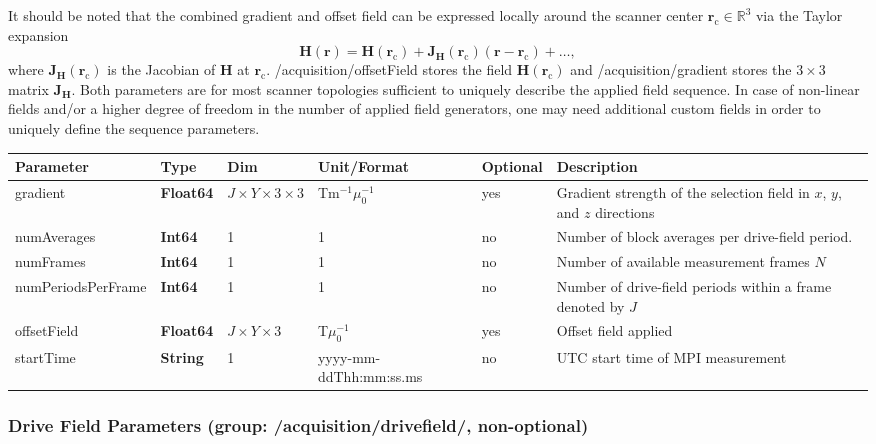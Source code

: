 \documentclass[landscape,a4paper]{article} %
\newcommand{\inltab}[1]{{\ttfamily\bfseries\color{blue}#1}}
\newcommand{\inlvar}[1]{{\ttfamily#1}}
\begin{document}
\begin{multicols}{2}
It should be noted that the combined gradient and offset field can be expressed locally around the scanner center $\mathbf r_\text{c}\in \mathbb R^3$ via the Taylor expansion
\begin{equation}
	\mathbf H(\mathbf r) = \mathbf H(\mathbf r_\text{c}) + \mathbf J_{\mathbf H}(\mathbf r_\text{c}) (\mathbf r - \mathbf r_\text{c}) + \dots,
\end{equation}
where $\mathbf J_{\mathbf H}(\mathbf r_\text{c})$ is the Jacobian of $\mathbf H$ at $\mathbf r_\text{c}$. \inlvar{/acquisition/offsetField} stores the field $\mathbf H(\mathbf r_\text{c})$ and \inlvar{/acquisition/gradient} stores the $3\times 3$ matrix $\mathbf J_{\mathbf H}$. Both parameters are for most scanner topologies sufficient to uniquely describe the applied field sequence. In case of non-linear fields and/or a higher degree of freedom in the number of applied field generators, one may need additional custom fields in order to uniquely define the sequence parameters.

\end{multicols}

\noindent \begin{tabularx}{\columnwidth}{lllllX}
\textbf{Parameter} & \textbf{Type} & \textbf{Dim} & \textbf{Unit/Format} & \textbf{Optional} & \textbf{Description} \\ \hline
\inlvar{gradient} & \inltab{Float64} & $J \times Y \times 3 \times 3$ & Tm$^{-1}\mu_0^{-1}$ & yes & Gradient strength of the selection field in $x$, $y$, and $z$ directions \\ \hline
\inlvar{numAverages} & \inltab{Int64} & 1 & 1& no & Number of block averages per drive-field period. \\ \hline
\inlvar{numFrames} & \inltab{Int64} & 1 & 1& no & Number of available measurement frames $N$ \\ \hline
\inlvar{numPeriodsPerFrame} & \inltab{Int64} & 1 & 1 & no & Number of drive-field periods within a frame denoted by $J$ \\ \hline
\inlvar{offsetField} & \inltab{Float64} & $J \times Y \times 3$ & T$\mu_0^{-1}$ & yes & Offset field applied  \\ \hline
\inlvar{startTime} & \inltab{String} & 1 & yyyy-mm-ddThh:mm:ss.ms & no & UTC start time of MPI measurement \\ \hline
\end{tabularx}

\newpage

\subsubsection{Drive Field Parameters (group: \inlvar{/acquisition/drivefield/}, non-optional)}
\end{document}
